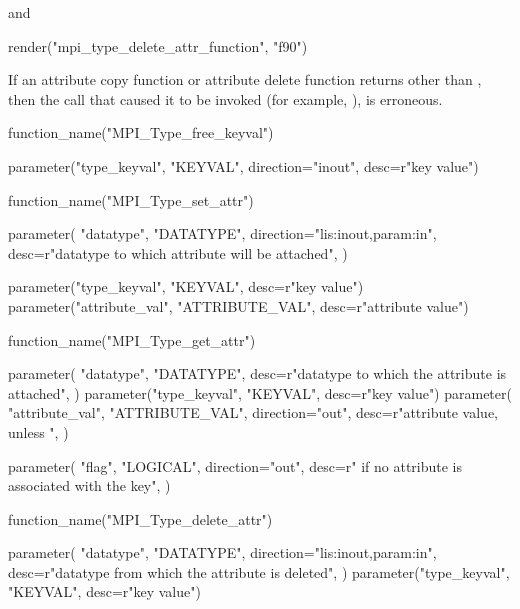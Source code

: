 \noindent
and

\begin{mpi-binding}
    render("mpi_type_delete_attr_function", "f90")
\end{mpi-binding}

If an attribute copy function or attribute delete function returns other than
, then the call that caused it to be invoked (for example,
), is erroneous.

\begin{mpi-binding}
    function_name("MPI_Type_free_keyval")
    
    parameter("type_keyval", "KEYVAL", direction="inout", desc=r"key value")
\end{mpi-binding}

\begin{mpi-binding}
    function_name("MPI_Type_set_attr")
    
    parameter(
        "datatype",
        "DATATYPE",
        direction="lis:inout,param:in",
        desc=r"datatype to which attribute will be attached",
    )
    
    parameter("type_keyval", "KEYVAL", desc=r"key value")
    parameter("attribute_val", "ATTRIBUTE_VAL", desc=r"attribute value")
\end{mpi-binding}

\begin{mpi-binding}
    function_name("MPI_Type_get_attr")
    
    parameter(
        "datatype",
        "DATATYPE",
        desc=r"datatype to which the attribute is attached",
    )
    parameter("type_keyval", "KEYVAL", desc=r"key value")
    parameter(
        "attribute_val",
        "ATTRIBUTE_VAL",
        direction="out",
        desc=r"attribute value, unless ",
    )
    
    parameter(
        "flag",
        "LOGICAL",
        direction="out",
        desc=r" if no attribute is associated with the key",
    )
\end{mpi-binding}

\begin{mpi-binding}
    function_name("MPI_Type_delete_attr")
    
    parameter(
        "datatype",
        "DATATYPE",
        direction="lis:inout,param:in",
        desc=r"datatype from which the attribute is deleted",
    )
    parameter("type_keyval", "KEYVAL", desc=r"key value")
\end{mpi-binding}


